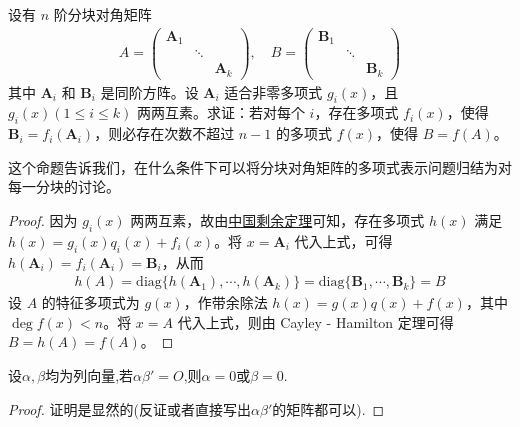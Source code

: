 \documentclass[../../main.tex]{subfiles}%
\begin{document}
\begin{proposition}\label{proposition:可以将分块对角矩阵的多项式表示问题归结为对每一分块的讨论的条件}
设有 $n$ 阶分块对角矩阵
\begin{align*}
A=\begin{pmatrix}
\boldsymbol{A}_1 & & \\
& \ddots & \\
& & \boldsymbol{A}_k
\end{pmatrix}, \quad B=\begin{pmatrix}
\boldsymbol{B}_1 & & \\
& \ddots & \\
& & \boldsymbol{B}_k
\end{pmatrix}
\end{align*}
其中 $\boldsymbol{A}_i$ 和 $\boldsymbol{B}_i$ 是同阶方阵。设 $\boldsymbol{A}_i$ 适合非零多项式 $g_i(x)$，且 $g_i(x) (1\leqslant  i\leqslant  k)$ 两两互素。求证：若对每个 $i$，存在多项式 $f_i(x)$，使得 $\boldsymbol{B}_i = f_i(\boldsymbol{A}_i)$，则必存在次数不超过 $n - 1$ 的多项式 $f(x)$，使得 $B = f(A)$。
\end{proposition}
\begin{note}
这个命题告诉我们，在什么条件下可以将分块对角矩阵的多项式表示问题归结为对每一分块的讨论。
\end{note}
\begin{proof}

因为 $g_i(x)$ 两两互素，故由\hyperref[theorem:中国剩余定理]{中国剩余定理}可知，存在多项式 $h(x)$ 满足 $h(x)=g_i(x)q_i(x)+f_i(x)$。将 $x = \boldsymbol{A}_i$ 代入上式，可得 $h(\boldsymbol{A}_i)=f_i(\boldsymbol{A}_i)=\boldsymbol{B}_i$，从而
\begin{align*}
h(A)=\mathrm{diag}\{h(\boldsymbol{A}_1),\cdots,h(\boldsymbol{A}_k)\}=\mathrm{diag}\{\boldsymbol{B}_1,\cdots,\boldsymbol{B}_k\}=B
\end{align*}
设 $A$ 的特征多项式为 $g(x)$，作带余除法 $h(x)=g(x)q(x)+f(x)$，其中 $\deg f(x)<n$。将 $x = A$ 代入上式，则由 Cayley - Hamilton 定理可得 $B = h(A)=f(A)$。

\end{proof}

\begin{lemma}\label{lemma:向量乘积为零的结论}
设$\alpha,\beta$均为列向量,若$\alpha \beta'=O$,则$\alpha=0$或$\beta=0$.
\end{lemma}
\begin{proof}

证明是显然的(反证或者直接写出$\alpha \beta'$的矩阵都可以).

\end{proof}
\end{document}
